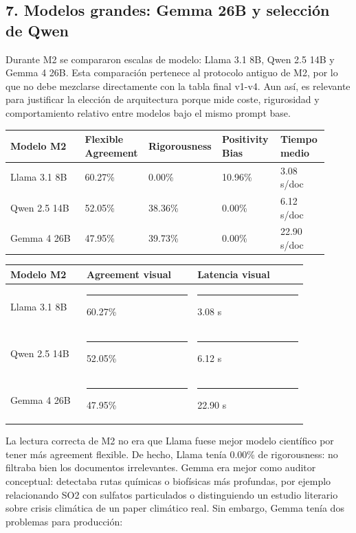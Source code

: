 \subsection{7. Modelos grandes: Gemma 26B y selección de Qwen}

Durante M2 se compararon escalas de modelo: Llama 3.1 8B, Qwen 2.5 14B y Gemma 4 26B. Esta comparación pertenece al protocolo antiguo de M2, por lo que no debe mezclarse directamente con la tabla final v1-v4. Aun así, es relevante para justificar la elección de arquitectura porque mide coste, rigurosidad y comportamiento relativo entre modelos bajo el mismo prompt base.

\begin{center}
\scriptsize
\setlength{\tabcolsep}{5pt}
\renewcommand{\arraystretch}{1.15}
\begin{tabular}{p{0.23\linewidth}p{0.18\linewidth}p{0.18\linewidth}p{0.18\linewidth}p{0.15\linewidth}}
\toprule
Modelo M2 & Flexible Agreement & Rigorousness & Positivity Bias & Tiempo medio \\
\midrule
Llama 3.1 8B & 60.27\% & 0.00\% & 10.96\% & 3.08 s/doc \\
Qwen 2.5 14B & 52.05\% & 38.36\% & 0.00\% & 6.12 s/doc \\
Gemma 4 26B & 47.95\% & 39.73\% & 0.00\% & 22.90 s/doc \\
\bottomrule
\end{tabular}
\end{center}

\begin{center}
\scriptsize
\setlength{\tabcolsep}{5pt}
\renewcommand{\arraystretch}{1.2}
\begin{tabular}{p{0.22\linewidth}p{0.32\linewidth}p{0.32\linewidth}}
\toprule
Modelo M2 & Agreement visual & Latencia visual \\
\midrule
Llama 3.1 8B & \rule{3.50cm}{0.8ex} 60.27\% & \rule{0.51cm}{0.8ex} 3.08 s \\
Qwen 2.5 14B & \rule{3.02cm}{0.8ex} 52.05\% & \rule{1.02cm}{0.8ex} 6.12 s \\
Gemma 4 26B & \rule{2.78cm}{0.8ex} 47.95\% & \rule{3.80cm}{0.8ex} 22.90 s \\
\bottomrule
\end{tabular}
\end{center}

La lectura correcta de M2 no era que Llama fuese mejor modelo científico por tener más agreement flexible. De hecho, Llama tenía 0.00\% de rigorousness: no filtraba bien los documentos irrelevantes. Gemma era mejor como auditor conceptual: detectaba rutas químicas o biofísicas más profundas, por ejemplo relacionando SO2 con sulfatos particulados o distinguiendo un estudio literario sobre crisis climática de un paper climático real. Sin embargo, Gemma tenía dos problemas para producción:

